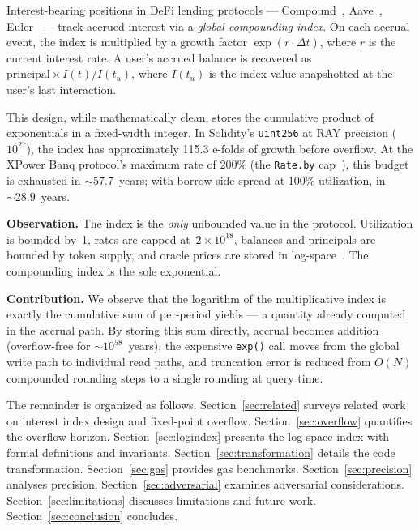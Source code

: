 \documentclass[10pt,a4paper,twocolumn]{article}
\begin{document}
Interest-bearing positions in DeFi lending protocols --- Compound~\cite{compound2019}, Aave~\cite{aave2020}, Euler~\cite{euler2022} --- track accrued interest via a \emph{global compounding index}. On each accrual event, the index is multiplied by a growth factor $\exp(r \cdot \Delta t)$, where $r$ is the current interest rate. A user's accrued balance is recovered as $\text{principal} \times I(t) / I(t_u)$, where $I(t_u)$ is the index value snapshotted at the user's last interaction.

This design, while mathematically clean, stores the cumulative product of exponentials in a fixed-width integer. In Solidity's \texttt{uint256} at RAY precision ($10^{27}$), the index has approximately 115.3 e-folds of growth before overflow. At the XPower Banq protocol's maximum rate of 200\% (the \texttt{Rate.by} cap~\cite{wp}), this budget is exhausted in ${\sim}57.7$~years; with borrow-side spread at 100\% utilization, in ${\sim}28.9$~years.

\textbf{Observation.} The index is the \emph{only} unbounded value in the protocol. Utilization is bounded by~1, rates are capped at~$2 \times 10^{18}$, balances and principals are bounded by token supply, and oracle prices are stored in log-space~\cite{wp}. The compounding index is the sole exponential.

\textbf{Contribution.} We observe that the logarithm of the multiplicative index is exactly the cumulative sum of per-period yields --- a quantity already computed in the accrual path. By storing this sum directly, accrual becomes addition (overflow-free for ${\sim}10^{58}$~years), the expensive \texttt{exp()} call moves from the global write path to individual read paths, and truncation error is reduced from $O(N)$ compounded rounding steps to a single rounding at query time.

The remainder is organized as follows. Section~\ref{sec:related} surveys related work on interest index design and fixed-point overflow. Section~\ref{sec:overflow} quantifies the overflow horizon. Section~\ref{sec:logindex} presents the log-space index with formal definitions and invariants. Section~\ref{sec:transformation} details the code transformation. Section~\ref{sec:gas} provides gas benchmarks. Section~\ref{sec:precision} analyses precision. Section~\ref{sec:adversarial} examines adversarial considerations. Section~\ref{sec:limitations} discusses limitations and future work. Section~\ref{sec:conclusion} concludes.

\end{document}
